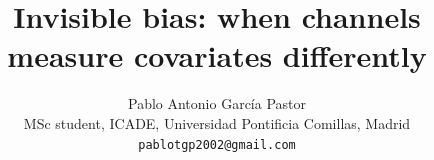 \documentclass[11pt,a4paper]{article}
\title{Invisible bias: when channels measure covariates differently}
\author{Pablo Antonio García Pastor\\ \small MSc student, ICADE, Universidad Pontificia Comillas, Madrid\\ \small\texttt{pablotgp2002@gmail.com}}
\date{}
\theoremstyle{plain}
\theoremstyle{definition}
\begin{document}
\maketitle

\begin{abstract}

\end{abstract}














\appendix




\end{document}
